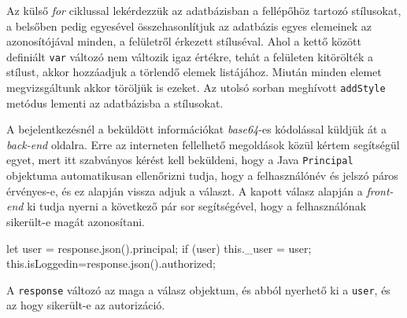 Az külső \textit{for} ciklussal lekérdezzük az adatbázisban a fellépőhöz tartozó stílusokat, a belsőben pedig egyesével összehasonlítjuk az adatbázis egyes elemeinek az azonosítójával minden, a felületről érkezett stíluséval. Ahol a kettő között definiált \texttt{var} változó nem változik igaz értékre, tehát a felületen kitörölték a stílust, akkor hozzáadjuk a törlendő elemek listájához. Miután minden elemet megvizsgáltunk akkor töröljük is ezeket. Az utolsó sorban meghívott \texttt{addStyle} metódus lementi az adatbázisba a stílusokat.


A bejelentkezésnél a beküldött információkat \textit{base64}-es kódolással küldjük át a \textit{back-end} oldalra. Erre az interneten fellelhető megoldások közül kértem segítségül egyet, mert itt szabványos kérést kell beküldeni, hogy a Java \texttt{Principal} objektuma automatikusan ellenőrizni tudja, hogy a felhasználónév és jelszó páros érvényes-e, és ez alapján vissza adjuk a választ. A kapott válasz alapján a \textit{front-end} ki tudja nyerni a következő pár sor segítségével, hogy a felhasználónak sikerült-e magát azonosítani.
\begin{java}
let user = response.json().principal;
if (user) {
    this._user = user;
    this.isLoggedin=response.json().authorized;
}
\end{java}
A \texttt{response} változó az maga a válasz objektum, és abból nyerhető ki a \texttt{user}, és az hogy sikerült-e az autorizáció.


